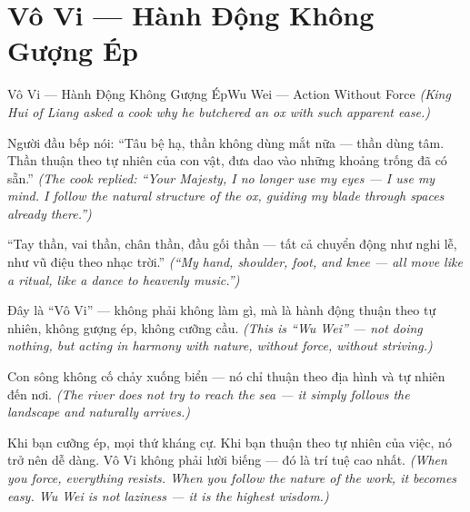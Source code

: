 \section{Vô Vi — Hành Động Không Gượng Ép}
\begin{truyen}{Vô Vi — Hành Động Không Gượng Ép}{Wu Wei — Action Without Force}
\textit{(King Hui of Liang asked a cook why he butchered an ox with such apparent ease.)}

Người đầu bếp nói: ``Tâu bệ hạ, thần không dùng mắt nữa — thần dùng tâm. Thần thuận theo tự nhiên của con vật, đưa dao vào những khoảng trống đã có sẵn.''
\textit{(The cook replied: ``Your Majesty, I no longer use my eyes — I use my mind. I follow the natural structure of the ox, guiding my blade through spaces already there.'')}

``Tay thần, vai thần, chân thần, đầu gối thần — tất cả chuyển động như nghi lễ, như vũ điệu theo nhạc trời.''
\textit{(``My hand, shoulder, foot, and knee — all move like a ritual, like a dance to heavenly music.'')}

Đây là ``Vô Vi'' — không phải không làm gì, mà là hành động thuận theo tự nhiên, không gượng ép, không cưỡng cầu.
\textit{(This is ``Wu Wei'' — not doing nothing, but acting in harmony with nature, without force, without striving.)}

Con sông không cố chảy xuống biển — nó chỉ thuận theo địa hình và tự nhiên đến nơi.
\textit{(The river does not try to reach the sea — it simply follows the landscape and naturally arrives.)}

\end{truyen}

\begin{baihoc}
Khi bạn cưỡng ép, mọi thứ kháng cự. Khi bạn thuận theo tự nhiên của việc, nó trở nên dễ dàng. Vô Vi không phải lười biếng — đó là trí tuệ cao nhất.
\textit{(When you force, everything resists. When you follow the nature of the work, it becomes easy. Wu Wei is not laziness — it is the highest wisdom.)}
\end{baihoc}
\ngancach

